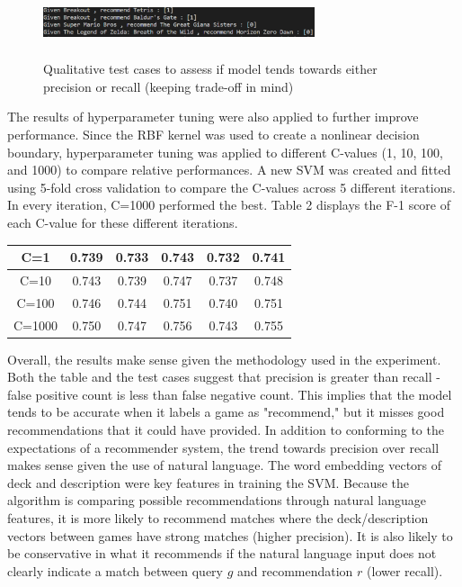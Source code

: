 \documentclass[10pt,twocolumn]{article}
\begin{document}
\begin{figure}[h!]
\includegraphics[width=8cm, height=2cm]{testcases_hyperparams_img.PNG}
\centering
\caption{Qualitative test cases to assess if model tends towards either precision or recall (keeping trade-off in mind)}
\end{figure}

The results of hyperparameter tuning were also applied to further improve performance. Since the RBF kernel was used to create a nonlinear decision boundary, hyperparameter tuning was applied to different C-values (1, 10, 100, and 1000) to compare relative performances. A new SVM was created and fitted using 5-fold cross validation to compare the C-values across 5 different iterations. In every iteration, C=1000 performed the best. Table 2 displays the F-1 score of each C-value for these different iterations.

\begin{center}
\begin{tabular}{ |c|c|c|c|c|c|} 
  \hline
  C=1 & 0.739 & 0.733  & 0.743 & 0.732 & 0.741 \\ 
  \hline
  C=10 & 0.743 & 0.739 & 0.747 & 0.737 & 0.748 \\ 
  \hline
  C=100 & 0.746 & 0.744 & 0.751 & 0.740 & 0.751 \\ 
  \hline
  C=1000 & 0.750 & 0.747 & 0.756 & 0.743 & 0.755 \\
  \hline
\end{tabular}
\end{center}

Overall, the results make sense given the methodology used in the experiment. Both the table and the test cases suggest that precision is greater than recall - false positive count is less than false negative count. This implies that the model tends to be accurate when it labels a game as "recommend," but it misses good recommendations that it could have provided. In addition to conforming to the expectations of a recommender system, the trend towards precision over recall makes sense given the use of natural language. The word embedding vectors of deck and description were key features in training the SVM. Because the algorithm is comparing possible recommendations through natural language features, it is more likely to recommend matches where the deck/description vectors between games have strong matches (higher precision). It is also likely to be conservative in what it recommends if the natural language input does not clearly indicate a match between query $g$ and recommendation $r$ (lower recall).
\end{document}

